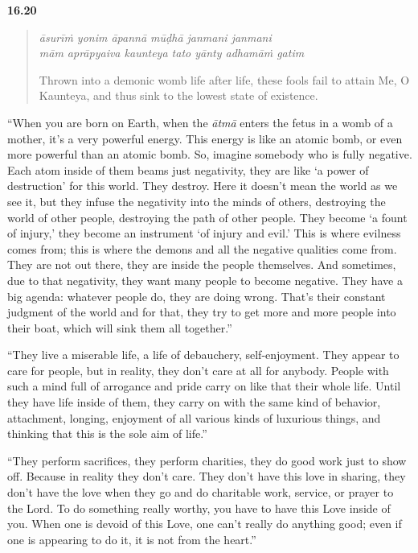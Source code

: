 \par\noindent\textbf{16.20}\par
\begin{verse}
\textit{āsurīṁ yonim āpannā mūḍhā janmani janmani} \\
\textit{mām aprāpyaiva kaunteya tato yānty adhamāṁ gatim}

\noindent Thrown into a demonic womb life after life, these fools fail to attain Me, O Kaunteya, and thus sink to the lowest state of existence.
\end{verse}
\par


\enquote{When you are born on Earth, when the \textit{ātmā} enters the fetus in a womb of a mother, it’s a very powerful energy. This energy is like an atomic bomb, or even more powerful than an atomic bomb. So, imagine somebody who is fully negative. Each atom inside of them beams just negativity, they are like \enquote{a power of destruction} for this world. They destroy. Here it doesn’t mean the world as we see it, but they infuse the negativity into the minds of others, destroying the world of other people, destroying the path of other people. They become \enquote{a fount of injury,} they become an instrument \enquote{of injury and evil.} This is where evilness comes from; this is where the demons and all the negative qualities come from. They are not out there, they are inside the people themselves. And sometimes, due to that negativity, they want many people to become negative. They have a big agenda: whatever people do, they are doing wrong. That’s their constant judgment of the world and for that, they try to get more and more people into their boat, which will sink them all together.}

\enquote{They live a miserable life, a life of debauchery, self-enjoyment. They appear to care for people, but in reality, they don’t care at all for anybody. People with such a mind full of arrogance and pride carry on like that their whole life. Until they have life inside of them, they carry on with the same kind of behavior, attachment, longing, enjoyment of all various kinds of luxurious things, and thinking that this is the sole aim of life.}

\enquote{They perform sacrifices, they perform charities, they do good work just to show off. Because in reality they don’t care. They don’t have this love in sharing, they don’t have the love when they go and do charitable work, service, or prayer to the Lord. To do something really worthy, you have to have this Love inside of you. When one is devoid of this Love, one can’t really do anything good; even if one is appearing to do it, it is not from the heart.}

